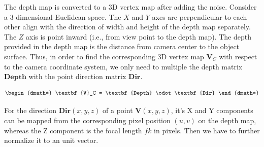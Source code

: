 %		
The depth map is converted to a 3D vertex map after adding the noise.
Consider a 3-dimensional Euclidean space. The $ X $ and $ Y $ axes are perpendicular to each other align with the direction of width and height of the depth map separately. The $ Z $ axis is point inward (i.e., from view point to the depth map). The depth provided in the depth map is the distance from camera center to the object surface. Thus, in order to find the corresponding 3D vertex map $ \textbf{V}_C $ with respect to the camera coordinate system, we only need to multiple the depth matrix $ \textbf{Depth} $ with the point direction matrix $ \textbf{Dir} $.

\begin{dgroup*}
	\begin{dmath*}
		\textbf{V}_C = \textbf{Depth} \odot \textbf{Dir}
	\end{dmath*}
\end{dgroup*}

For the direction $ \textbf{Dir}(x,y,z) $ of a point $ \textbf{V}(x,y,z) $, it's X and Y components can be mapped from the corresponding pixel position $ (u,v) $ on the depth map, whereas the Z component is the focal length $ fk $ in pixels. Then we have to further normalize it to an unit vector.

